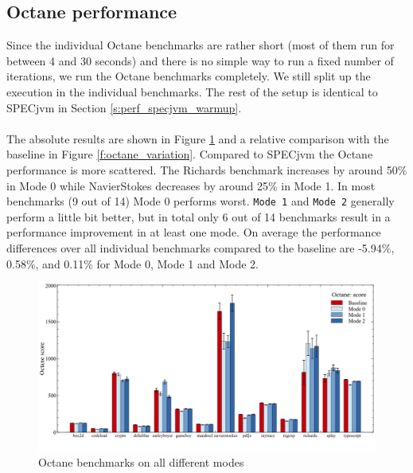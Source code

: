 \subsection{Octane performance}
\label{s:perf_octane}
Since the individual Octane benchmarks are rather short (most of them run for between 4 and 30 seconds) and there is no simple way to run a fixed number of iterations, we run the Octane benchmarks completely. We still split up the execution in the individual benchmarks. The rest of the setup is identical to SPECjvm in Section \ref{s:perf_specjvm_warmup}.
\\\\
The absolute results are shown in Figure \ref{f:octane} and a relative comparison with the baseline in Figure \ref{f:octane_variation}.
Compared to SPECjvm the Octane performance is more scattered. The Richards benchmark increases by around 50\% in Mode 0 while NavierStokes decreases by around 25\% in Mode 1. In most benchmarks (9 out of 14) Mode 0 performs worst.
\texttt{Mode 1} and \texttt{Mode 2} generally perform a little bit better, but in total only 6 out of 14 benchmarks result in a performance improvement in at least one mode.
On average the performance differences over all individual benchmarks compared to the baseline are -5.94\%, 0.58\%, and 0.11\% for Mode 0, Mode 1 and Mode 2.
\begin{figure}[ht]
  \begin{center}
    \centering
    \includegraphics[width=1.0\textwidth]{figures/octane.png}
    \caption{Octane benchmarks on all different modes}
    \label{f:octane}
  \end{center}
\end{figure}

